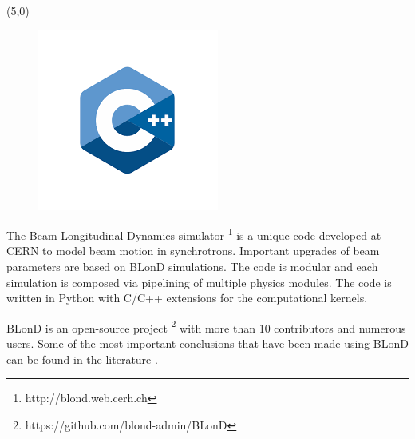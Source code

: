 \begin{frame}
\begin{textblock}{2}
\begin{figure}
		\end{figure}
	\end{textblock}
	\begin{textblock}{2}(5,0)
	\begin{figure}
		\includegraphics[width=\textwidth]{figures/cpp-logo}
	\end{figure}
	\end{textblock}
	\vspace{1.5cm}
	\begin{block}{}
		The \underline{B}eam \underline{Lon}gitudinal \underline{D}ynamics simulator \footnote{http://blond.web.cerh.ch}  is a unique code developed at CERN to model beam motion in synchrotrons. Important upgrades of beam parameters are based on BLonD simulations. The code is modular and each simulation is composed via pipelining of multiple physics modules. The code is written in Python with C/C++ extensions for the computational kernels.
		
		BLonD is an open-source project \footnote{https://github.com/blond-admin/BLonD} with more than 10 contributors and numerous users. Some of the most important conclusions that have been made using BLonD can be found in the literature   .
	\end{block}
\end{frame}

